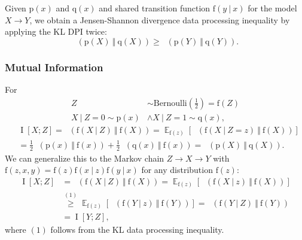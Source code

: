 \documentclass[25pt,a0paper,landscape]{tikzposter}
\begin{document}
\begin{columns}
{\begin{tcolorbox}[colback=green!5!white,colframe=teal!75!black,title=From KL to Jenson-Shannon Divergence to Mutual Information]
\begin{multicols}{2}
Given $\mathrm{p}(x)$ and $\mathrm{q}(x)$ and shared transition function $\mathrm{f}(y \:\vert\:x)$ for the model $X \rightarrow Y$, we obtain a Jensen-Shannon divergence data processing inequality by applying the KL DPI twice:
$$
\mathop{\mathrm{D_\mathrm{JSD}}}(\mathrm{p}(X) \:\Vert\: \mathrm{q}(X)) \ge \mathop{\mathrm{D_\mathrm{JSD}}}(\mathrm{p}(Y) \:\Vert\: \mathrm{q}(Y)).
$$

\subsubsection{Mutual Information}

For 
$$
\begin{aligned}
Z &\sim \mathrm{Bernoulli}(\frac{1}{2}) = \mathrm{f}(Z) \\
X \:\vert\:Z = 0 \sim \mathrm{p}(x) &\land X \:\vert\:Z = 1 \sim \mathrm{q}(x),
\end{aligned}
$$
$$
\begin{aligned}
&\mathop{\mathrm{I}}[X;Z] = \mathop{\mathrm{D_\mathrm{KL}}}(\mathrm{f}(X \:\vert\:Z) \:\Vert\: \mathrm{f}(X)) = \mathop{\mathrm{\mathbb{E}}}_{\mathrm{f}(z)} \left [ \mathop{\mathrm{D_\mathrm{KL}}}(\mathrm{f}(X \:\vert\:Z = z) \:\Vert\: \mathrm{f}(X)) \right ]\\
&= \frac{1}{2} \mathop{\mathrm{D_\mathrm{KL}}}(\mathrm{p}(x) \:\Vert\: \mathrm{f}(x)) + \frac{1}{2} \mathop{\mathrm{D_\mathrm{KL}}}(\mathrm{q}(x) \:\Vert\: \mathrm{f}(x))= \mathop{\mathrm{D_\mathrm{JSD}}}(\mathrm{p}(X) \:\Vert\: \mathrm{q}(X)).
\end{aligned}
$$
We can generalize this to the Markov chain $Z \rightarrow X \rightarrow Y$ with $\mathrm{f}(z, x, y) = \mathrm{f}(z) \mathrm{f}(x \:\vert\:z) \mathrm{f}(y \:\vert\:x)$ for any distribution $\mathrm{f}(z)$:
$$
\begin{aligned}
\mathop{\mathrm{I}}[X;Z] &= \mathop{\mathrm{D_\mathrm{KL}}}(\mathrm{f}(X \:\vert\:Z) \:\Vert\: \mathrm{f}(X)) = \mathop{\mathrm{\mathbb{E}}}_{\mathrm{f}(z)} \left [ \mathop{\mathrm{D_\mathrm{KL}}}(\mathrm{f}(X \:\vert\:z) \:\Vert\: \mathrm{f}(X)) \right ]\\
&\overset{(1)}{\ge} \mathop{\mathrm{\mathbb{E}}}_{\mathrm{f}(z)} \left [ \mathop{\mathrm{D_\mathrm{KL}}}(\mathrm{f}(Y \:\vert\:z) \:\Vert\: \mathrm{f}(Y)) \right ] = \mathop{\mathrm{D_\mathrm{KL}}}(\mathrm{f}(Y \:\vert\:Z) \:\Vert\: \mathrm{f}(Y))\\
&= \mathop{\mathrm{I}}[Y;Z],
\end{aligned}
$$
where $(1)$ follows from the KL data processing inequality. 

\end{multicols}
\end{tcolorbox}}
\end{columns}
\end{document}
